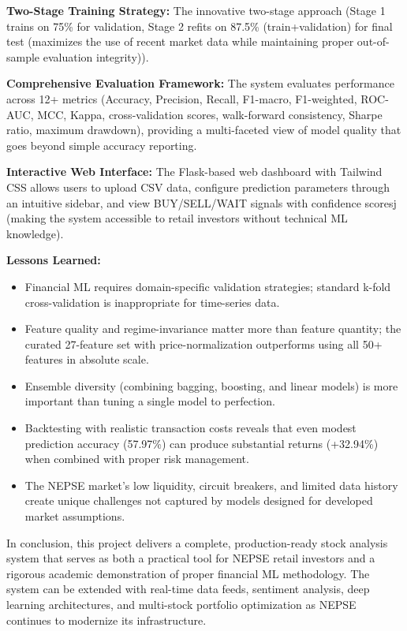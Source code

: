 \documentclass[12pt, a4paper]{report}
\begin{document}
	\textbf{Two-Stage Training Strategy:} The innovative two-stage approach (Stage 1 trains on 75\% for validation, Stage 2 refits on 87.5\% (train+validation) for final test (maximizes the use of recent market data while maintaining proper out-of-sample evaluation integrity)).
	
	\textbf{Comprehensive Evaluation Framework:} The system evaluates performance across 12+ metrics (Accuracy, Precision, Recall, F1-macro, F1-weighted, ROC-AUC, MCC, Kappa, cross-validation scores, walk-forward consistency, Sharpe ratio, maximum drawdown), providing a multi-faceted view of model quality that goes beyond simple accuracy reporting.
	
	\textbf{Interactive Web Interface:} The Flask-based web dashboard with Tailwind CSS allows users to upload CSV data, configure prediction parameters through an intuitive sidebar, and view BUY/SELL/WAIT signals with confidence scoresj (making the system accessible to retail investors without technical ML knowledge).
	
	\textbf{Lessons Learned:}
	\vspace{-18pt}
	\begin{itemize}
		\item Financial ML requires domain-specific validation strategies; standard k-fold cross-validation is inappropriate for time-series data.
		\item Feature quality and regime-invariance matter more than feature quantity; the curated 27-feature set with price-normalization outperforms using all 50+ features in absolute scale.
		\item Ensemble diversity (combining bagging, boosting, and linear models) is more important than tuning a single model to perfection.
		\item Backtesting with realistic transaction costs reveals that even modest prediction accuracy (57.97\%) can produce substantial returns (+32.94\%) when combined with proper risk management.
		\item The NEPSE market's low liquidity, circuit breakers, and limited data history create unique challenges not captured by models designed for developed market assumptions.
	\end{itemize}
	
	In conclusion, this project delivers a complete, production-ready stock analysis system that serves as both a practical tool for NEPSE retail investors and a rigorous academic demonstration of proper financial ML methodology. The system can be extended with real-time data feeds, sentiment analysis, deep learning architectures, and multi-stock portfolio optimization as NEPSE continues to modernize its infrastructure.
\end{document}
